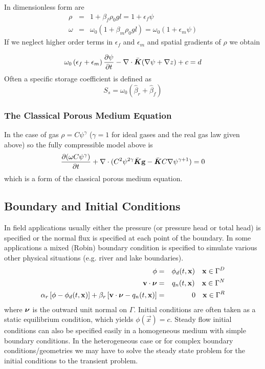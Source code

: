 \documentclass[10pt,dvips,twoside,reqno]{amsart}
\begin{document}
In dimensionless form  are
\begin{eqnarray}
  \label{eq:slCompressDimensionless}
  \rho &=& 1 + \beta_f \rho_0 g l = 1 + \epsilon_f \psi \\
  \omega &=& \omega_0(1 + \beta_m \rho_0 g l) = \omega_0(1 + \epsilon_m \psi)
\end{eqnarray}
If we neglect higher order terms in
$\epsilon_f$ and $\epsilon_m$ and spatial gradients of $\rho$ \citep{Chavent_Jaffre_86} we obtain

\begin{equation}
\label{eq:onePhaseSlCompPress}
\omega_0 \left( \epsilon_f + \epsilon_m \right) \frac{\partial {\psi}}{\partial {t}} - \nabla \cdot \bar{\mbox{{\boldmath ${K}$}}} (\nabla \psi + \nabla z) + c = d
\end{equation}
Often a specific storage coefficient is defined as
\begin{equation}
  \label{eq:specificStorage}
  S_s = \omega_0 (\hat{\beta}_r + \hat{\beta}_f)
\end{equation}

\subsubsection{The Classical Porous Medium Equation}

In the case of gas $\rho = C \psi^{\gamma}$ ($\gamma = 1$ for ideal
gases and the real gas law given above) so the fully compressible
model above is
\begin{equation}
  \label{eq:pome}
\frac{\partial {(\omega C \psi^{\gamma} )}}{\partial {t}} + \nabla \cdot (C^2 \psi^{2\gamma} \bar{\mbox{{\boldmath ${K}$}}} {\bf g} -\bar{\mbox{{\boldmath ${K}$}}} C \nabla \psi^{\gamma + 1}) = 0
\end{equation}
which is a form of the classical porous medium equation.

\subsection{Boundary and Initial Conditions}

In field applications usually either the pressure (or pressure head or
total head) is specified or the normal flux is specified at each point
of the boundary. In some applications a mixed (Robin) boundary
condition is specified to simulate various other physical situations
(e.g. river and lake boundaries).
\begin{eqnarray}
\phi &=& \phi_d (t,{\bf x}) \quad {\bf x} \in \Gamma^D\\
{\bf v} \cdot \mbox{{\boldmath ${\nu}$}} & = & q_n(t,{\bf x}) \quad {\bf x} \in \Gamma^N\\
\alpha_r \left[ \phi - \phi_d(t,{\bf x}) \right] + \beta_r \left[ {\bf v} \cdot \mbox{{\boldmath ${\nu}$}} - q_n(t, {\bf x}) \right] &=& 0
\quad {\bf x} \in \Gamma^R
\end{eqnarray}
where $\mbox{{\boldmath ${\nu}$}}$ is the outward unit normal on $\Gamma$. Initial
conditions are often taken as a static equilibrium condition, which
yields $\phi(\vec x)=c$. Steady flow initial conditions can also be
specified easily in a homogeneous medium with simple boundary
conditions. In the heterogeneous case or for complex boundary
conditions/geometries we may have to solve the steady state problem
for the initial conditions to the transient problem.
\end{document}
